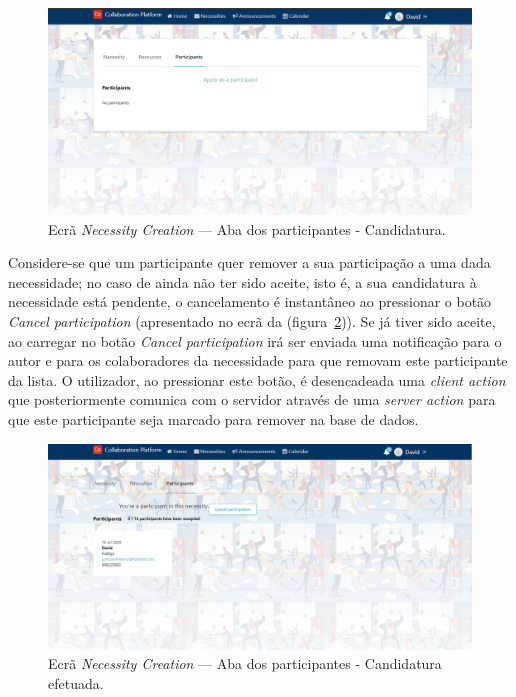 \begin{figure}[H]
  \centering 
  \includegraphics[scale=0.4]{figures/Participants.png}
  \caption{Ecrã \textit{Necessity Creation} --- Aba dos participantes - Candidatura.}\label{fig:participants}
\end{figure}

Considere-se que um participante quer remover a sua participação a uma dada necessidade; no caso de ainda não ter sido aceite, isto é, a sua candidatura à necessidade está pendente, o cancelamento é instantâneo ao pressionar o botão \textit{Cancel participation} (apresentado no ecrã da (figura~\ref{fig:participants_removal})).
Se já tiver sido aceite, ao carregar no botão \textit{Cancel participation} irá ser enviada uma notificação para o autor e para os colaboradores da necessidade para que removam este participante da lista. 
O utilizador, ao pressionar este botão, é desencadeada uma \textit{client action} que posteriormente comunica com o servidor através de uma \textit{server action} para que este participante seja marcado para remover na base de dados.

\begin{figure}[H]
  \centering 
  \includegraphics[scale=0.4]{figures/Participants_removal.png}
  \caption{Ecrã \textit{Necessity Creation} --- Aba dos participantes - Candidatura efetuada.}\label{fig:participants_removal}
\end{figure}


